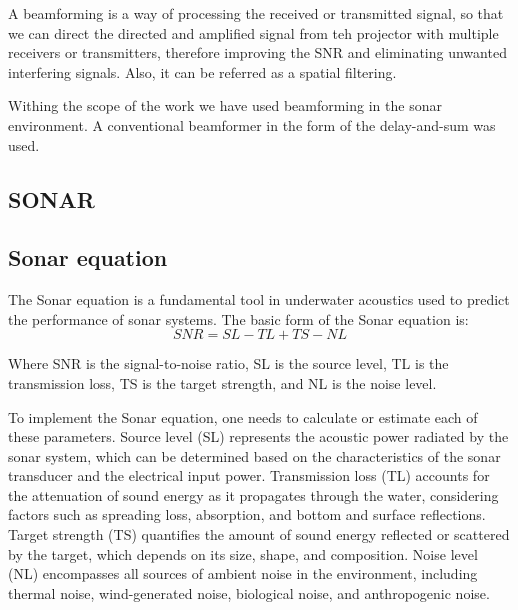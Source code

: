 A beamforming is a way of processing the received or transmitted signal, so that we can direct the directed and amplified signal from teh projector with multiple receivers or transmitters, therefore improving the SNR and eliminating unwanted interfering signals. Also, it can be referred as a spatial filtering.

Withing the scope of the work we have used beamforming in the sonar environment. A conventional beamformer in the form of the delay-and-sum was used. 
\subsection{SONAR}
\subsection{Sonar equation }
The Sonar equation is a fundamental tool in underwater acoustics used to predict the performance of sonar systems. 
The basic form of the Sonar equation is:
\begin{equation}
    SNR=SL-TL+TS-NL
\end{equation}

Where
SNR is the signal-to-noise ratio,
SL is the source level,
TL is the transmission loss,
TS is the target strength, and
NL is the noise level.

To implement the Sonar equation, one needs to calculate or estimate each of these parameters. 
Source level (SL) represents the acoustic power radiated by the sonar system, which can be determined based on the characteristics of the sonar transducer and the electrical input power. 
Transmission loss (TL) accounts for the attenuation of sound energy as it propagates through the water, considering factors such as spreading loss, absorption, and bottom and surface reflections. 
Target strength (TS) quantifies the amount of sound energy reflected or scattered by the target, which depends on its size, shape, and composition. 
Noise level (NL) encompasses all sources of ambient noise in the environment, including thermal noise, wind-generated noise, biological noise, and anthropogenic noise.

